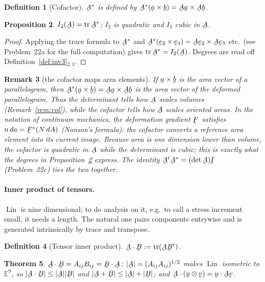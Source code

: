 \documentclass[17pt,a4paper]{extreport}
\DeclareRobustCommand{\vek}[1]{\underaccent{\tilde}{#1}}
\newcommand{\Lin}{\operatorname{Lin}}
\newcommand{\tr}{\operatorname{tr}}
\newcommand{\I}{\vek{I}}
\newcommand{\ba}{\vek{a}}
\newcommand{\bb}{\vek{b}}
\newcommand{\bu}{\vek{u}}
\newcommand{\bv}{\vek{v}}
\newcommand{\be}{\vek{e}}
\newcommand{\bA}{\vek{A}}
\newcommand{\bB}{\vek{B}}
\newcommand{\ip}[2]{#1\cdot#2}
\theoremstyle{scplain}
\newtheorem{theorem}{Theorem}[chapter]
\newtheorem{proposition}[theorem]{Proposition}
\theoremstyle{scdefn}
\newtheorem{definition}[theorem]{Definition}
\newtheorem{remark}[theorem]{Remark}
\theoremstyle{scplain}
\begin{document}
\begin{definition}[Cofactor]\label{def:cof}
$\bA^{*}$ is defined by $\bA^{*}(\ba\times\bb)=\bA\ba\times\bA\bb$.
\end{definition}

\begin{proposition}\label{prop:I2cof}
$I_{2}(\bA)=\tr\bA^{*}$; $I_{2}$ is quadratic and $I_{3}$ cubic in $\bA$.
\end{proposition}

\begin{proof}
Applying the trace formula to $\bA^{*}$ and
$\bA^{*}(\be_2\times\be_3)=\bA\be_2\times\bA\be_3$ etc.\ (see Problem~22a
for the full computation) gives $\tr\bA^{*}=I_{2}(\bA)$. Degrees are read
off Definition~\ref{def:inv3}$_{2,3}$.
\end{proof}

\begin{remark}[the cofactor maps area elements]%
\label{rem:cofgeom}
If $\ba\times\bb$ is the area vector of a parallelogram, then
$\bA^{*}(\ba\times\bb)=\bA\ba\times\bA\bb$ is the area vector of the
deformed parallelogram. Thus the determinant tells how $\bA$ scales
\emph{volumes} (Remark~\ref{rem:vol}), while the cofactor tells how
$\bA$ scales \emph{oriented areas}. In the notation of continuum
mechanics, the deformation gradient $\vek{F}$ satisfies
$n\,da=\vek{F}^{*}(N\,dA)$ (Nanson's formula): the cofactor converts
a reference area element into its current image. Because area is one
dimension lower than volume, the cofactor is quadratic in $\bA$ while
the determinant is cubic; this is exactly what the degrees in
Proposition~\ref{prop:I2cof} express. The identity
$\bA^{t}\bA^{*}=(\det\bA)\I$ (Problem~22c) ties the two together.
\end{remark}

\paragraph*{Inner product of tensors.}
$\Lin$ is nine dimensional; to do analysis on it, e.g.\ to call a stress
increment small, it needs a length. The natural one pairs components
entrywise and is generated intrinsically by trace and transpose.

\begin{definition}[Tensor inner product]\label{def:tip}
$\bA\cdot\bB:=\tr(\bA\bB^{t})$.
\end{definition}

\begin{theorem}\label{thm:tip}
$\bA\cdot\bB=A_{ij}B_{ij}=\bB\cdot\bA$; $|\bA|=(A_{ij}A_{ij})^{1/2}$ makes
$\Lin$ isometric to $\mathbb{E}^{9}$, so
$|\bA\cdot\bB|\le|\bA||\bB|$ and $|\bA+\bB|\le|\bA|+|\bB|$; and
$\bA\cdot(\bu\otimes\bv)=\ip\bu{\bA\bv}$.
\end{theorem}
\end{document}
